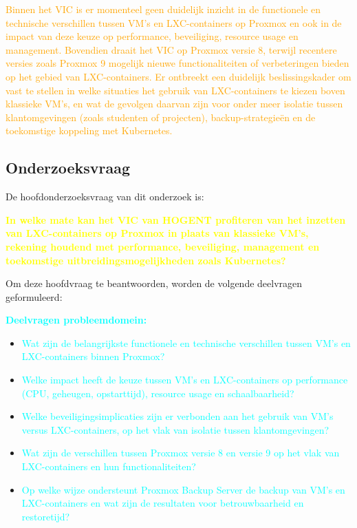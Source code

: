 {\textcolor{orange}{
Binnen het VIC is er momenteel geen duidelijk inzicht in de functionele en technische verschillen tussen VM's en LXC-containers op Proxmox en ook in de impact van deze keuze op performance, beveiliging, resource usage en management. Bovendien draait het VIC op Proxmox versie 8, terwijl recentere versies zoals Proxmox 9 mogelijk nieuwe functionaliteiten of verbeteringen bieden op het gebied van LXC-containers. Er ontbreekt een duidelijk beslissingskader om vast te stellen in welke situaties het gebruik van LXC-containers te kiezen boven klassieke VM’s, en wat de gevolgen daarvan zijn voor onder meer isolatie tussen klantomgevingen (zoals studenten of projecten), backup-strategieën en de toekomstige koppeling met Kubernetes.
}}

\subsection{Onderzoeksvraag}

De hoofdonderzoeksvraag van dit onderzoek is:

{\textcolor{yellow}{
\textbf{In welke mate kan het VIC van HOGENT profiteren van het inzetten van LXC-containers op Proxmox in plaats van klassieke VM's, rekening houdend met performance, beveiliging, management en toekomstige uitbreidingsmogelijkheden zoals Kubernetes?}
}}

Om deze hoofdvraag te beantwoorden, worden de volgende deelvragen geformuleerd:

\textcolor{cyan}{\textbf{Deelvragen probleemdomein:}}
\begin{itemize}
    \item \textcolor{cyan}{Wat zijn de belangrijkste functionele en technische verschillen tussen VM's en LXC-containers binnen Proxmox?}
    \item \textcolor{cyan}{Welke impact heeft de keuze tussen VM's en LXC-containers op performance (CPU, geheugen, opstarttijd), resource usage en schaalbaarheid?}
    \item \textcolor{cyan}{Welke beveiligingsimplicaties zijn er verbonden aan het gebruik van VM's versus LXC-containers, op het vlak van isolatie tussen klantomgevingen?}
    \item \textcolor{cyan}{Wat zijn de verschillen tussen Proxmox versie 8 en versie 9 op het vlak van LXC-containers en hun functionaliteiten?}
    \item \textcolor{cyan}{Op welke wijze ondersteunt Proxmox Backup Server de backup van VM's en LXC-containers en wat zijn de resultaten voor betrouwbaarheid en restoretijd?}
\end{itemize}

